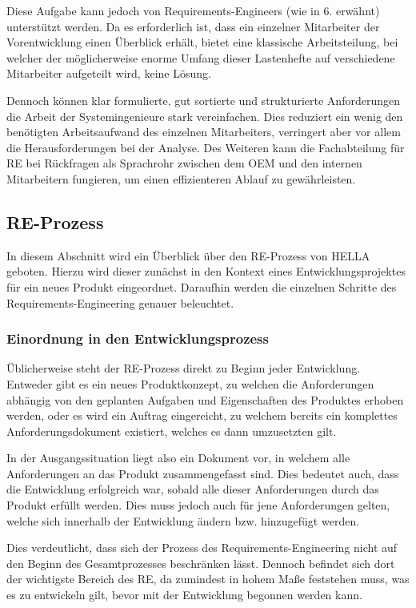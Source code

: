 \documentclass[12pt]{report}
\begin{document}
Diese Aufgabe kann jedoch von Requirements-Engineers (wie in 6. erwähnt) unterstützt werden. Da es erforderlich ist, dass ein einzelner Mitarbeiter der Vorentwicklung einen Überblick erhält, bietet eine klassische Arbeitsteilung, bei welcher der möglicherweise enorme Umfang dieser Lastenhefte auf verschiedene Mitarbeiter aufgeteilt wird, keine Lösung.

Dennoch können klar formulierte, gut sortierte und strukturierte Anforderungen die Arbeit der Systemingenieure stark vereinfachen. Dies reduziert ein wenig den benötigten Arbeitsaufwand des einzelnen Mitarbeiters, verringert aber vor allem die Herausforderungen bei der Analyse. Des Weiteren kann die Fachabteilung für RE bei Rückfragen als Sprachrohr zwischen dem OEM und den internen Mitarbeitern fungieren, um einen effizienteren Ablauf zu gewährleisten.
 
\subsection{RE-Prozess}
In diesem Abschnitt wird ein Überblick über den RE-Prozess von HELLA geboten. Hierzu wird dieser zunächst in den Kontext eines Entwicklungsprojektes für ein neues Produkt eingeordnet. Daraufhin werden die einzelnen Schritte des Requirements-Engineering genauer beleuchtet. 

\subsubsection{Einordnung in den Entwicklungsprozess}
Üblicherweise steht der RE-Prozess direkt zu Beginn jeder Entwicklung. Entweder gibt es ein neues Produktkonzept, zu welchen die Anforderungen abhängig von den geplanten Aufgaben und Eigenschaften des Produktes erhoben werden, oder es wird ein Auftrag eingereicht, zu welchem bereits ein komplettes Anforderungsdokument existiert, welches es dann umzusetzten gilt.

In der Ausgangssituation liegt also ein Dokument vor, in welchem alle Anforderungen an das Produkt zusammengefasst sind. Dies bedeutet auch, dass die Entwicklung erfolgreich war, sobald alle dieser Anforderungen durch das Produkt erfüllt werden. Dies muss jedoch auch für jene Anforderungen gelten, welche sich innerhalb der Entwicklung ändern bzw. hinzugefügt werden.

Dies verdeutlicht, dass sich der Prozess des Requirements-Engineering nicht auf den Beginn des Gesamtprozesses beschränken lässt. Dennoch befindet sich dort der wichtigste Bereich des RE, da zumindest in hohem Maße feststehen muss, was es zu entwickeln gilt, bevor mit der Entwicklung begonnen werden kann.
\end{document}
